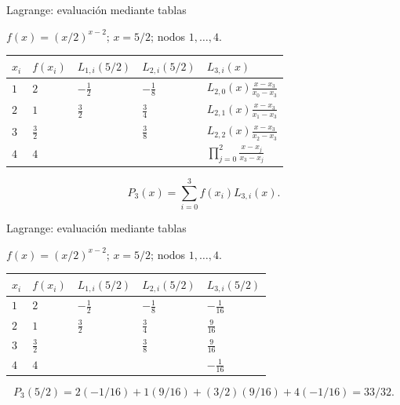 \documentclass[original_version/main.tex]{subfiles}
\begin{document}
\begin{frame}[t]{Lagrange: evaluación mediante tablas}
\par\noindent\begin{minipage}[t][12mm][t]{\textwidth}\small\strut $f(x)=(x/2)^{x-2}$; $x=5/2$; nodos $1,\ldots,4$.\end{minipage}\par\nointerlineskip
\begin{minipage}[t]{\textwidth}\begingroup\scriptsize\setlength{\tabcolsep}{3pt}\begin{center}\begin{tabular}{|C{.065\textwidth}|C{.095\textwidth}|C{.19\textwidth}|C{.25\textwidth}|C{.25\textwidth}|}\hline
\rule[-2mm]{0pt}{6mm}$x_i$&$f(x_i)$&$L_{1,i}(5/2)$&$L_{2,i}(5/2)$&$L_{3,i}(x)$\\\hline
\rule[-2.5mm]{0pt}{9mm}$1$&$2$&$-\frac12$&$-\frac18$&$L_{2,0}(x)\frac{x-x_3}{x_0-x_3}$\\\hline
\rule[-2.5mm]{0pt}{9mm}$2$&$1$&$\frac32$&$\frac34$&$L_{2,1}(x)\frac{x-x_3}{x_1-x_3}$\\\hline
\rule[-2.5mm]{0pt}{9mm}$3$&$\frac{3}{2}$&&$\frac38$&$L_{2,2}(x)\frac{x-x_3}{x_2-x_3}$\\\hline
\rule[-2.5mm]{0pt}{9mm}$4$&$4$&&&$\prod_{j=0}^2\frac{x-x_j}{x_3-x_j}$\\\hline
\end{tabular}\end{center}\endgroup\par
\end{minipage}\par\[P_3(x)=\sum_{i=0}^3f(x_i)L_{3,i}(x).\]
\end{frame}
\begin{frame}[t]{Lagrange: evaluación mediante tablas}
\par\noindent\begin{minipage}[t][12mm][t]{\textwidth}\small\strut $f(x)=(x/2)^{x-2}$; $x=5/2$; nodos $1,\ldots,4$.\end{minipage}\par\nointerlineskip
\begin{minipage}[t]{\textwidth}\begingroup\scriptsize\setlength{\tabcolsep}{3pt}\begin{center}\begin{tabular}{|C{.065\textwidth}|C{.095\textwidth}|C{.19\textwidth}|C{.25\textwidth}|C{.25\textwidth}|}\hline
\rule[-2mm]{0pt}{6mm}$x_i$&$f(x_i)$&$L_{1,i}(5/2)$&$L_{2,i}(5/2)$&$L_{3,i}(5/2)$\\\hline
\rule[-2.5mm]{0pt}{9mm}$1$&$2$&$-\frac12$&$-\frac18$&$-\frac1{16}$\\\hline
\rule[-2.5mm]{0pt}{9mm}$2$&$1$&$\frac32$&$\frac34$&$\frac9{16}$\\\hline
\rule[-2.5mm]{0pt}{9mm}$3$&$\frac{3}{2}$&&$\frac38$&$\frac9{16}$\\\hline
\rule[-2.5mm]{0pt}{9mm}$4$&$4$&&&$-\frac1{16}$\\\hline
\end{tabular}\end{center}\endgroup\par
\end{minipage}\par\scriptsize\[P_3(5/2)=2(-1/16)+1(9/16)+(3/2)(9/16)+4(-1/16)=33/32.\]
\end{frame}
\end{document}
